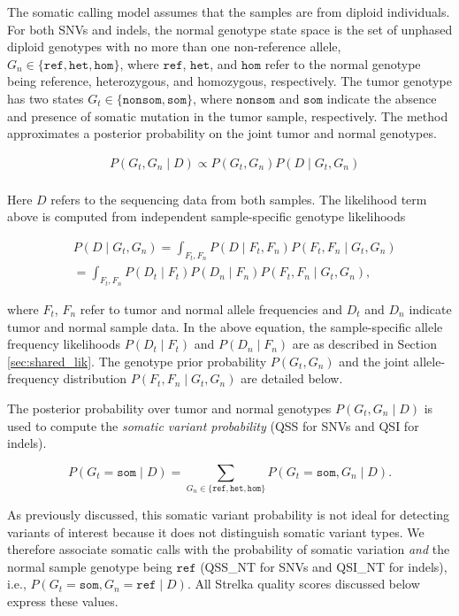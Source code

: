 \documentclass{article}
\begin{document}
The somatic calling model assumes that the samples are from diploid individuals. For both SNVs and indels, the normal genotype state space is the set of unphased diploid genotypes with no more than one non-reference allele, $G_n \in \{ \texttt{ref}, \texttt{het}, \texttt{hom}\}$, where $\texttt{ref}$, $\texttt{het}$, and $\texttt{hom}$ refer to the normal genotype being reference, heterozygous, and homozygous, respectively. The tumor genotype has two states $G_t \in \{ \texttt{nonsom}, \texttt{som} \}$, where $\texttt{nonsom}$ and $\texttt{som}$ indicate the absence and presence of somatic mutation in the tumor sample, respectively. The method approximates a posterior probability on the joint tumor and normal genotypes.

\begin{align*}
	& P(G_t,G_n \mid D) \propto P(G_t,G_n) P(D \mid G_t,G_n) \\
\end{align*}


Here $D$ refers to the sequencing data from both samples. The likelihood term above is computed from independent sample-specific genotype likelihoods

\begin{align*}
	& P(D \mid G_t,G_n) = \int_{F_t,F_n}{P(D \mid F_t,F_n)P(F_t,F_n \mid G_t,G_n)} \\
	& = \int_{F_t,F_n}{P(D_t \mid F_t)P(D_n \mid F_n)P(F_t,F_n \mid G_t,G_n)},
\end{align*}

\noindent where $F_t$, $F_n$ refer to tumor and normal allele frequencies and $D_t$ and $D_n$ indicate tumor and normal sample data. In the above equation, the sample-specific allele frequency likelihoods $P(D_t \mid F_t)$ and $P(D_n \mid F_n)$ are as described in Section \ref{sec:shared_lik}. The genotype prior probability $P(G_t, G_n)$ and the joint allele-frequency distribution $P(F_t,F_n \mid G_t,G_n)$ are detailed below.

The posterior probability over tumor and normal genotypes $P(G_t,G_n \mid D)$ is used to compute the {\em somatic variant probability} (QSS for SNVs and QSI for indels).

\begin{equation}
\label{eqn:somVarProb}
	P(G_t = \texttt{som} \mid D) = \sum_{G_n \in \{ \texttt{ref}, \texttt{het}, \texttt{hom} \}}{P(G_t=\texttt{som},G_n \mid D)}.
\end{equation}

As previously discussed, this somatic variant probability is not ideal for detecting variants of interest because it does not distinguish somatic variant types. We therefore associate somatic calls with the probability of somatic variation {\em and} the normal sample genotype being $\texttt{ref}$ (QSS\_NT for SNVs and QSI\_NT for indels), i.e., $P(G_t = \texttt{som}, G_n = \texttt{ref} \mid D)$. All Strelka quality scores discussed below express these values.
\end{document}
